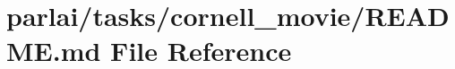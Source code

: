 \hypertarget{parlai_2tasks_2cornell__movie_2README_8md}{}\section{parlai/tasks/cornell\+\_\+movie/\+R\+E\+A\+D\+ME.md File Reference}
\label{parlai_2tasks_2cornell__movie_2README_8md}
